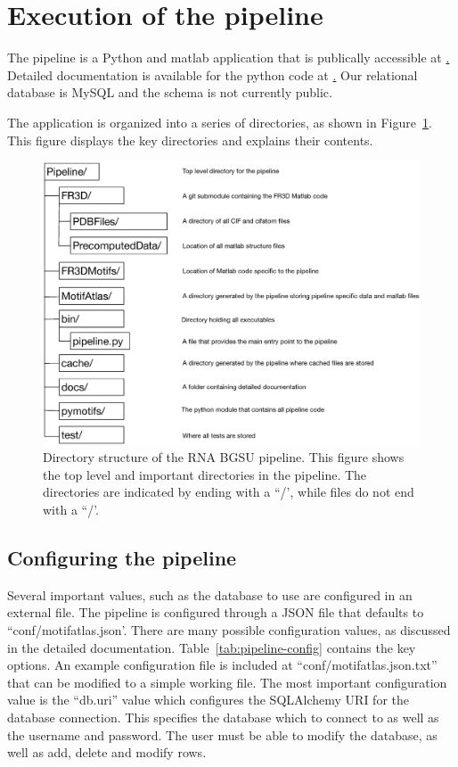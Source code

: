 \section{Execution of the pipeline}

The pipeline is a Python and matlab application that is publically accessible at
\href{https://github.com/BGSU-RNA/RNA-3D-Hub-core}. Detailed documentation is
available for the python code at \href{http://rna-3d-hub-core.readthedocs.io/}.
Our relational database is MySQL and the schema is not currently public.

The application is organized into a series of directories, as shown in
Figure~\ref{fig:pipeline-organization}. This figure displays the key directories
and explains their contents.

\begin{figure}
  \includegraphics[width=\linewidth]{chapter-2/figs/directories}
\caption{Directory structure of the RNA BGSU pipeline. This figure shows the top
level and important directories in the pipeline. The directories are indicated
by ending with a ``/', while files do not end with a ``/'.}
\label{fig:pipeline-organization}
\end{figure}

\subsection{Configuring the pipeline}

Several important values, such as the database to use are configured in an
external file. The pipeline is configured through a JSON file that defaults to
``conf/motifatlas.json'. There are many possible configuration values, as
discussed in the detailed documentation. Table~\ref{tab:pipeline-config}
contains the key options. An example configuration file is included at
``conf/motifatlas.json.txt'' that can be modified to a simple working file. The
most important configuration value is the ``db.uri'' value which configures the
SQLAlchemy URI for the database connection. This specifies the database which to
connect to as well as the username and password. The user must be able to modify
the database, as well as add, delete and modify rows.

